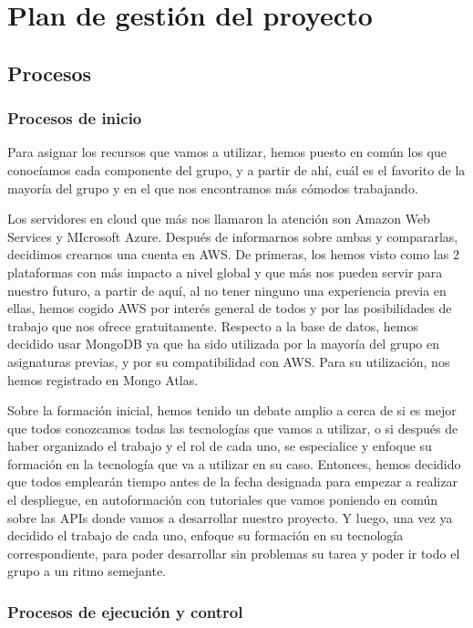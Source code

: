 \documentclass{article}
\begin{document}
\section{Plan de gestión del proyecto}

\subsection{Procesos}

\subsubsection{Procesos de inicio}

Para asignar los recursos que vamos a utilizar, hemos puesto en común los que conocíamos cada componente del grupo, y a partir de ahí, cuál es el favorito de la mayoría del grupo y en el que nos encontramos más cómodos trabajando.

Los servidores en cloud que más nos llamaron la atención son Amazon Web Services y MIcrosoft Azure. Después de informarnos sobre ambas y compararlas, decidimos crearnos una cuenta en AWS. De primeras, los hemos visto como las 2 plataformas con más impacto a nivel global y que más nos pueden servir para nuestro futuro, a partir de aquí, al no tener ninguno una experiencia previa en ellas, hemos cogido AWS por interés general de todos y por las posibilidades de trabajo que nos ofrece gratuitamente.
Respecto a la base de datos, hemos decidido usar MongoDB ya que ha sido utilizada por la mayoría del grupo en asignaturas previas, y por su compatibilidad con AWS. Para su utilización, nos hemos registrado en Mongo Atlas.

Sobre la formación inicial, hemos tenido un debate amplio a cerca de si es mejor que todos conozcamos todas las tecnologías que vamos a utilizar, o si después de haber organizado el trabajo y el rol de cada uno, se especialice y enfoque su formación en la tecnología que va a utilizar en su caso. Entonces, hemos decidido que todos emplearán tiempo antes de la fecha designada para empezar a realizar el despliegue, en autoformación con tutoriales que vamos poniendo en común sobre las APIs donde vamos a desarrollar nuestro proyecto. Y luego, una vez ya decidido el trabajo de cada uno, enfoque su formación en su tecnología correspondiente, para poder desarrollar sin problemas su tarea y poder ir todo el grupo a un ritmo semejante.


\subsubsection{Procesos de ejecución y control}
\end{document}
